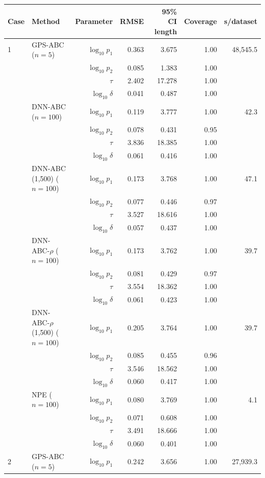 \begin{tabular}{llrrrrr}
\toprule
Case & Method & Parameter & RMSE & 95\% CI length & Coverage & s/dataset \\
\midrule
1 & GPS-ABC ($n=5$) & $\log_{10}p_1$ & 0.363 & 3.675 & 1.00 & 48,545.5 \\
 &  & $\log_{10}p_2$ & 0.085 & 1.383 & 1.00 &  \\
 &  & $\tau$ & 2.402 & 17.278 & 1.00 &  \\
 &  & $\log_{10}\delta$ & 0.041 & 0.487 & 1.00 &  \\
 & DNN-ABC ($n=100$) & $\log_{10}p_1$ & 0.119 & 3.777 & 1.00 & 42.3 \\
 &  & $\log_{10}p_2$ & 0.078 & 0.431 & 0.95 &  \\
 &  & $\tau$ & 3.836 & 18.385 & 1.00 &  \\
 &  & $\log_{10}\delta$ & 0.061 & 0.416 & 1.00 &  \\
 & DNN-ABC (1,500) ($n=100$) & $\log_{10}p_1$ & 0.173 & 3.768 & 1.00 & 47.1 \\
 &  & $\log_{10}p_2$ & 0.077 & 0.446 & 0.97 &  \\
 &  & $\tau$ & 3.527 & 18.616 & 1.00 &  \\
 &  & $\log_{10}\delta$ & 0.057 & 0.437 & 1.00 &  \\
 & DNN-ABC-$\rho$ ($n=100$) & $\log_{10}p_1$ & 0.173 & 3.762 & 1.00 & 39.7 \\
 &  & $\log_{10}p_2$ & 0.081 & 0.429 & 0.97 &  \\
 &  & $\tau$ & 3.554 & 18.362 & 1.00 &  \\
 &  & $\log_{10}\delta$ & 0.061 & 0.423 & 1.00 &  \\
 & DNN-ABC-$\rho$ (1,500) ($n=100$) & $\log_{10}p_1$ & 0.205 & 3.764 & 1.00 & 39.7 \\
 &  & $\log_{10}p_2$ & 0.085 & 0.455 & 0.96 &  \\
 &  & $\tau$ & 3.546 & 18.562 & 1.00 &  \\
 &  & $\log_{10}\delta$ & 0.060 & 0.417 & 1.00 &  \\
 & NPE ($n=100$) & $\log_{10}p_1$ & 0.080 & 3.769 & 1.00 & 4.1 \\
 &  & $\log_{10}p_2$ & 0.071 & 0.608 & 1.00 &  \\
 &  & $\tau$ & 3.491 & 18.666 & 1.00 &  \\
 &  & $\log_{10}\delta$ & 0.060 & 0.401 & 1.00 &  \\
\midrule
2 & GPS-ABC ($n=5$) & $\log_{10}p_1$ & 0.242 & 3.656 & 1.00 & 27,939.3 \\

\end{tabular}
